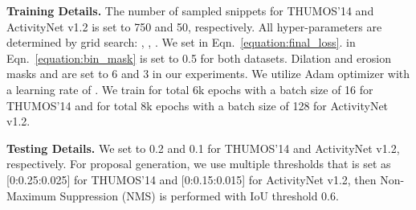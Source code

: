 \documentclass[final]{cvpr}
\begin{document}
\textbf{Training Details. } The number of sampled snippets  for THUMOS’14 and ActivityNet v1.2 is set to 750 and 50, respectively. All hyper-parameters are determined by grid search: , , . We set  in Eqn.~\ref{equation:final_loss}.  in Eqn.~\ref{equation:bin_mask} is set to 0.5 for both datasets. Dilation and erosion masks  and  are set to 6 and 3 in our experiments. We utilize Adam optimizer with a learning rate of . We train for total 6k epochs with a batch size of 16 for THUMOS'14 and for total 8k epochs with a batch size of 128 for ActivityNet v1.2.

\textbf{Testing Details. } We set  to 0.2 and 0.1 for THUMOS’14 and ActivityNet v1.2, respectively. For proposal generation, we use multiple thresholds that  is set as [0:0.25:0.025] for THUMOS'14 and [0:0.15:0.015] for ActivityNet v1.2, then Non-Maximum Suppression (NMS) is performed with IoU threshold 0.6.
\end{document}
